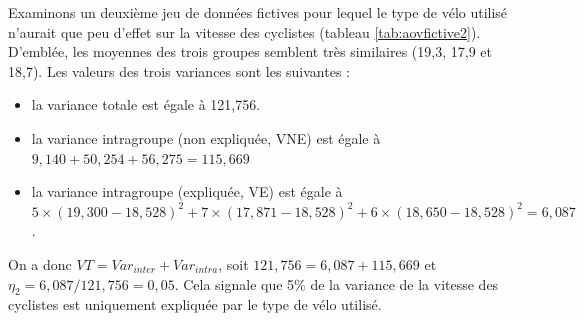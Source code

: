 \documentclass[
  11pt,
  french,
]{book}
\providecommand{\tightlist}{%
  \setlength{\itemsep}{0pt}\setlength{\parskip}{0pt}}
\begin{document}
Examinons un deuxième jeu de données fictives pour lequel le type de vélo utilisé n'aurait que peu d'effet sur la vitesse des cyclistes (tableau \ref{tab:aovfictive2}). D'emblée, les moyennes des trois groupes semblent très similaires (19,3, 17,9 et 18,7). Les valeurs des trois variances sont les suivantes :

\begin{itemize}
\tightlist
\item
  la variance totale est égale à 121,756.
\item
  la variance intragroupe (non expliquée, VNE) est égale à \(9,140+50,254+56,275 = 115,669\)
\item
  la variance intragroupe (expliquée, VE) est égale à \(5\times(19,300-18,528)^2+7\times(17,871-18,528)^2+6\times(18,650-18,528)^2 = 6,087\).
\end{itemize}

On a donc \(VT = Var_{inter} + Var_{intra}\), soit \(121,756 = 6,087 + 115,669\) et \(\eta_2 = 6,087 / 121,756 = 0,05\). Cela signale que 5\% de la variance de la vitesse des cyclistes est uniquement expliquée par le type de vélo utilisé.
\end{document}
